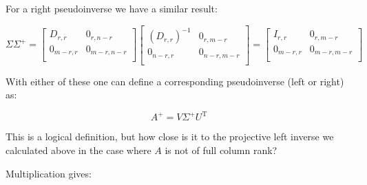 \documentclass{article}      %
\DeclareMathOperator{\TextTranspose}{T}
\newcommand{\transpose}[1]{{{#1}^{\TextTranspose}}}
\begin{document}
For a right pseudoinverse we have a similar result:

\[
\Sigma
\Sigma^{+}
=
\begin{bmatrix}
D_{r,r} & 0_{r,n-r} \\
0_{m-r,r} & 0_{m-r,n-r} \\
\end{bmatrix}
\begin{bmatrix}
(D_{r,r})^{-1} & 0_{r,m-r} \\
0_{n-r,r} & 0_{n-r,m-r} \\
\end{bmatrix}
=
\begin{bmatrix}
I_{r,r} & 0_{r,m-r} \\
0_{m-r,r} & 0_{m-r,m-r} \\
\end{bmatrix}
\]

With either of these one can define a corresponding pseudoinverse (left or right) as:

\begin{equation}
A^{+} = V \Sigma^{+} \transpose{U}
\end{equation}

This is a logical definition, but how close is it to the projective
left inverse we calculated above in the case where $A$ is not of full column 
rank?

Multiplication gives: 
\end{document}
